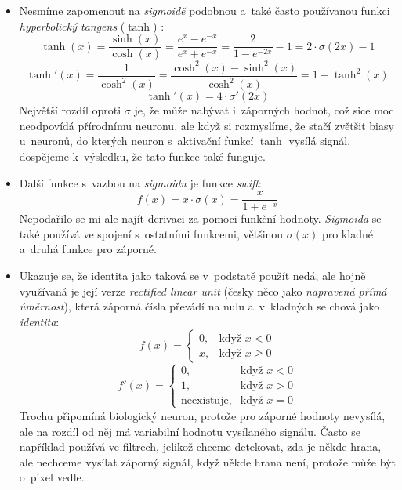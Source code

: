 \documentclass[12pt]{report}			%
\begin{document}
\begin{itemize}
						
					\item Nesmíme zapomenout na \emph{sigmoidě} podobnou a~také často používanou funkci \emph{hyperbolický tangens} ($\tanh$) \autocite{Book:FFActivationFunctions}:
						\begin{equation}\tanh(x) = \frac{\sinh(x)}{\cosh(x)} = \frac{e^x-e^{-x}}{e^x+e^{-x}} = \frac{2}{1-e^{-2x}} - 1 = 2\cdot\sigma(2x)-1\end{equation}										
						\begin{equation}\tanh'(x) = \frac{1}{\cosh^2(x)} = \frac{\cosh^2(x) - \sinh^2(x)}{\cosh^2(x)} = 1-\tanh^2(x)\end{equation}		
						\begin{equation}\tanh'(x) = 4\cdot \sigma'(2x)\end{equation}
						Největší rozdíl oproti $\sigma$ je, že může nabývat i~záporných hodnot, což sice moc neodpovídá přírodnímu neuronu, ale když si rozmyslíme, že stačí zvětšit biasy u~neuronů, do kterých neuron s~aktivační funkcí $\tanh$ vysílá signál, dospějeme k~výsledku, že tato funkce také funguje.
						
					\item Další funkce s~vazbou na \emph{sigmoidu} je funkce \emph{swift}:
						\begin{equation}f(x) = x\cdot \sigma(x) = \frac{x}{1+e^{-x}}\end{equation}										
						Nepodařilo se mi ale najít derivaci za pomoci funkční hodnoty. \emph{Sigmoida} se také používá ve spojení s~ostatními funkcemi, většinou $\sigma(x)$ pro kladné a~druhá funkce pro záporné.
						
						
					\item Ukazuje se, že identita jako taková se v~podstatě použít nedá, ale hojně využívaná je její  verze \emph{rectified linear unit} (česky něco jako \emph{napravená přímá úměrnost}), která záporná čísla převádí na nulu a~v~kladných se chová jako \emph{identita}:
						\begin{equation}f(x) = \begin{cases}0, & \text{když } x < 0\\x, & \text{když } x \geq 0 \end{cases}\end{equation}
						\begin{equation}f'(x) = \begin{cases}0, & \text{když } x < 0\\1, & \text{když } x > 0 \\\text{neexistuje}, & \text{když } x = 0 \end{cases}\end{equation}
						Trochu připomíná biologický neuron, protože pro záporné hodnoty nevysílá, ale na rozdíl od něj má variabilní hodnotu vysílaného signálu. Často se například používá ve filtrech, jelikož chceme detekovat, zda je někde hrana, ale nechceme vysílat záporný signál, když někde hrana není, protože může být o~pixel vedle. 
						

\end{itemize}
\end{document}
